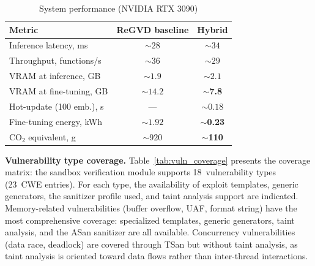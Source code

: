 \documentclass[runningheads]{llncs}
\begin{document}
\begin{table}
\centering
\caption{System performance (NVIDIA RTX 3090)}
\label{tab:performance}
\small
\begin{tabular}{|l|c|c|}
\hline
\textbf{Metric} & \textbf{ReGVD baseline} & \textbf{Hybrid} \\
\hline
Inference latency, ms & ${\sim}28$ & ${\sim}34$ \\
Throughput, functions/s & ${\sim}36$ & ${\sim}29$ \\
VRAM at inference, GB & ${\sim}1.9$ & ${\sim}2.1$ \\
VRAM at fine-tuning, GB & ${\sim}14.2$ & ${\sim}$\textbf{7.8} \\
Hot-update (100 emb.), s & --- & ${\sim}0.18$ \\
Fine-tuning energy, kWh & ${\sim}1.92$ & ${\sim}$\textbf{0.23} \\
CO$_2$ equivalent, g & ${\sim}920$ & ${\sim}$\textbf{110} \\
\hline
\end{tabular}
\end{table}

\textbf{Vulnerability type coverage.}
Table~\ref{tab:vuln_coverage} presents the coverage matrix: the sandbox verification module supports 18~vulnerability types (23~CWE entries). For each type, the availability of exploit templates, generic generators, the sanitizer profile used, and taint analysis support are indicated. Memory-related vulnerabilities (buffer overflow, UAF, format string) have the most comprehensive coverage: specialized templates, generic generators, taint analysis, and the ASan sanitizer are all available. Concurrency vulnerabilities (data race, deadlock) are covered through TSan but without taint analysis, as taint analysis is oriented toward data flows rather than inter-thread interactions.
\end{document}
